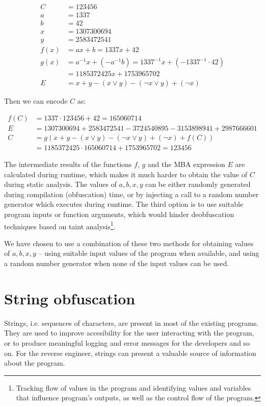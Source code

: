 \documentclass[
  digital, %
  table,   %
  twoside, %
  nolof,     %
  nolot,     %
]{fithesis3}
\theoremstyle{definition}
\begin{document}
\begin{align*}
C & = 123456 \\
a &= 1337 \\
b &= 42 \\
x &= 1307300694 \\
y &= 2583472541 \\
f(x) &= ax + b = 1337x + 42\\
g(x) &= a^{-1}x + (-a^{-1}b) = 1337^{-1}x + (-1337^{-1}\cdot 42) \\&= 1185372425x + 1753965702 \\
E &= x + y - (x \vee y)-(\neg x \vee y)+(\neg x)
\end{align*}

Then we can encode $C$ as:

\begin{align*}
    f(C) &= 1337\cdot 123456 + 42 = 165060714 \\
    E &= 1307300694 + 2583472541 - 3724540895 - 3153898941 + 2987666601 \\
    C &= g(x + y - (x \vee y)-(\neg x \vee y)+(\neg x) + f(C)) \\
    &= 1185372425\cdot165060714 + 1753965702 = 123456
\end{align*}

The intermediate results of the functions $f$, $g$ and the MBA expression $E$ are calculated during runtime, which makes it much harder to obtain the value of $C$ during static analysis. The values of $a,b,x,y$ can be either randomly generated during compilation (obfuscation) time,  or by injecting a call to a random number generator which executes during runtime. The third option is to use suitable program inputs or function arguments, which would hinder deobfuscation techniques based on taint analysis\footnote{Tracking flow of values in the program and identifying values and variables that influence program's outputs, as well as the control flow of the program.}. 

We have chosen to use a combination of these two methods for obtaining values of $a,b,x,y$ -- using suitable input values of the program when available, and using a random number generator when none of the input values can be used.

\section{String obfuscation}

Strings, i.e. sequences of characters, are present in most of the existing programs. They are used to improve accesibility for the user interacting with the program, or to produce meaningful logging and error messages for the developers and so on. For the reverse engineer, strings can present a valuable source of information about the program. %
\end{document}
